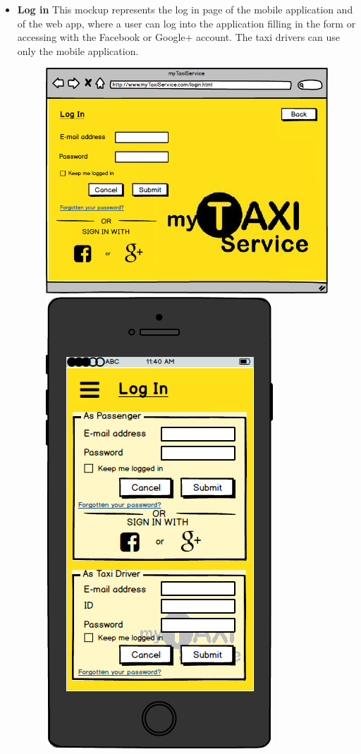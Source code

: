\documentclass[18pt,oneside,a4paper, titlepage]{article}
\begin{document}
\begin{itemize}
\begin{figure}[h]
				\end{figure}
				\\
				\item \textbf{Log in} This mockup represents the log in page of the mobile application and of the web app, where a user can log into the application filling in the form or accessing with the Facebook or Google+ account. The taxi drivers can use only the mobile application.
				\begin{figure}[h]
					\includegraphics[scale=0.3]{WebAppLogin.png}%
					\qquad\qquad
					\includegraphics[scale=0.3]{MobileAppLogin.png}
					

\end{figure}
\end{itemize}
\end{document}
